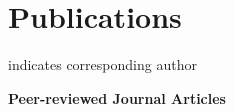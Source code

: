 \documentclass[../main.tex]{subfiles}
\begin{document}

\section{Publications} 
  \vspace{2pt}
  \resumeSubHeadingListStart
    \item
        \small \normalfont * indicates corresponding author
    \item
        \textbf{Peer-reviewed Journal Articles}  
        \def\labelprefix{J}
\end{document}
